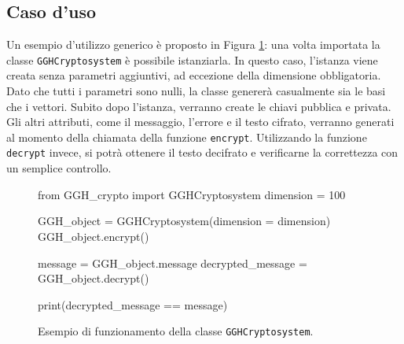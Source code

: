 \subsection{Caso d'uso}

Un esempio d'utilizzo generico è proposto in Figura \ref{fig:gghmoduleexample}: una volta 
importata la classe \texttt{GGHCryptosystem} è possibile istanziarla. In questo caso, 
l'istanza viene creata senza parametri aggiuntivi, ad eccezione della dimensione obbligatoria.
Dato che tutti i parametri sono nulli, la classe genererà casualmente sia le basi che i 
vettori. Subito dopo l'istanza, verranno create le chiavi pubblica e privata. Gli altri 
attributi, come il messaggio, l'errore e il testo cifrato, verranno generati al momento 
della chiamata della funzione \texttt{encrypt}. Utilizzando la funzione \texttt{decrypt} invece, 
si potrà ottenere il testo decifrato e verificarne la correttezza con un semplice controllo.

\begin{figure}[H]
    \begin{python}
        from GGH_crypto import GGHCryptosystem
        dimension = 100

        GGH_object = GGHCryptosystem(dimension = dimension)
        GGH_object.encrypt()

        message = GGH_object.message
        decrypted_message = GGH_object.decrypt()

        print(decrypted_message == message)
    \end{python}
    \caption{Esempio di funzionamento della classe \texttt{GGHCryptosystem}.}
    \label{fig:gghmoduleexample}
\end{figure}

